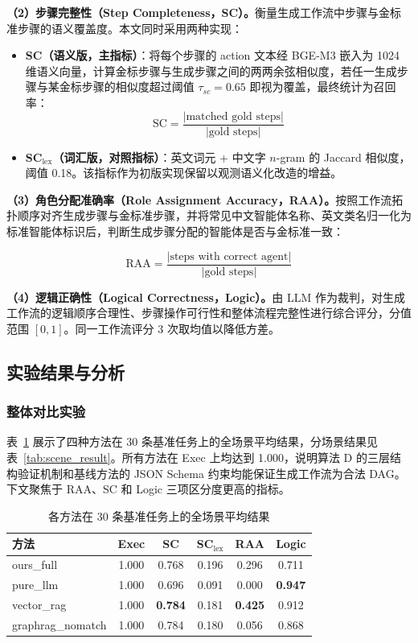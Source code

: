 \textbf{（2）步骤完整性（Step Completeness，SC）。}衡量生成工作流中步骤与金标准步骤的语义覆盖度。本文同时采用两种实现：
\begin{itemize}
    \item \textbf{SC（语义版，主指标）}：将每个步骤的 action 文本经 BGE-M3 嵌入为 1024 维语义向量，计算金标步骤与生成步骤之间的两两余弦相似度，若任一生成步骤与某金标步骤的相似度超过阈值 $\tau_{sc}=0.65$ 即视为覆盖，最终统计为召回率：
    \begin{equation}
        \text{SC} = \frac{|\text{matched gold steps}|}{|\text{gold steps}|}
    \end{equation}
    \item \textbf{SC$_{\text{lex}}$（词汇版，对照指标）}：英文词元 + 中文字 $n$-gram 的 Jaccard 相似度，阈值 0.18。该指标作为初版实现保留以观测语义化改造的增益。
\end{itemize}

\textbf{（3）角色分配准确率（Role Assignment Accuracy，RAA）。}按照工作流拓扑顺序对齐生成步骤与金标准步骤，并将常见中文智能体名称、英文类名归一化为标准智能体标识后，判断生成步骤分配的智能体是否与金标准一致：

\begin{equation}
\text{RAA} = \frac{|\text{steps with correct agent}|}{|\text{gold steps}|}
\end{equation}

\textbf{（4）逻辑正确性（Logical Correctness，Logic）。}由 LLM 作为裁判，对生成工作流的逻辑顺序合理性、步骤操作可行性和整体流程完整性进行综合评分，分值范围 $[0,1]$。同一工作流评分 3 次取均值以降低方差。

\subsection{实验结果与分析}

\subsubsection{整体对比实验}

表~\ref{tab:main_result} 展示了四种方法在 30 条基准任务上的全场景平均结果，分场景结果见表~\ref{tab:scene_result}。所有方法在 Exec 上均达到 1.000，说明算法 D 的三层结构验证机制和基线方法的 JSON Schema 约束均能保证生成工作流为合法 DAG。下文聚焦于 RAA、SC 和 Logic 三项区分度更高的指标。

\begin{table}[htbp]
\centering
\caption{各方法在 30 条基准任务上的全场景平均结果}
\label{tab:main_result}
\small
\begin{tabular}{lccccc}
\toprule
方法 & Exec & SC & SC$_{\text{lex}}$ & RAA & Logic \\
\midrule
ours\_full      & 1.000 & 0.768 & 0.196 & 0.296 & 0.711 \\
pure\_llm       & 1.000 & 0.696 & 0.091 & 0.000 & \textbf{0.947} \\
vector\_rag     & 1.000 & \textbf{0.784} & 0.181 & \textbf{0.425} & 0.912 \\
graphrag\_nomatch & 1.000 & 0.784 & 0.180 & 0.056 & 0.868 \\
\bottomrule
\end{tabular}
\end{table}

